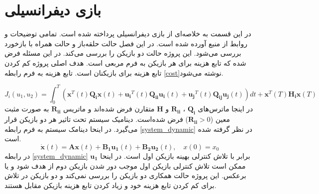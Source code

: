 \chapter{بازی دیفرانسیلی}
در این قسمت به خلاصه‌ای از بازی دیفرانسیلی پرداخته شده است. تمامی توضیحات و روابط  از منبع 
 \cite{article1}
آورده شده است. در این فصل حالت حلقه‌باز
 و حالت همراه با بازخورد بررسی می‌شود.
 این پروژه حالت دو بازیکن را بررسی می‌کند. در این مسئله فرض شده  که تابع هزینه برای هر بازیکن به فرم مربعی است. 	هدف اصلی پروژه کم کردن تابع هزینه برای بازیکنان است. تابع هزینه به فرم رابطه \ref{cost}نوشته می‌شود.

 \begin{equation}\label{cost}
 	J_i(u_1, u_2) = \int_{0}^{T}\left( \boldsymbol{x} ^T(t) \boldsymbol{Q_i} \boldsymbol{x}(t)+
 	 \boldsymbol{u_i} ^T(t) \boldsymbol{Q_{ii}} \boldsymbol{u_i}(t)+
 	 \boldsymbol{u_j} ^T(t)\boldsymbol{ Q_{ij} u_j}(t)
 	\right)dt+
 	\boldsymbol{ x} ^T(T)\boldsymbol{ H_i}\boldsymbol{ x}(T) 
  \end{equation}
در اینجا ماترس‌های 
$\boldsymbol{Q_i}$ ، $\boldsymbol{R_{ii}}$
و
$\boldsymbol{H}$
متقارن فرض شده‌اند و ماتریس 
$\boldsymbol{R_{ii}}$
به صورت مثبت معین ($\boldsymbol{R_{ii}}>0$)
فرض شده‌است.
دینامیک سیستم تحت تاثیر هر دو بازیکن قرار می‌گیرد. در اینحا دینامک سیستم به فرم رابطه \ref{system_dynamic} در نظر گرفته شده ‌است.
\begin{equation}\label{system_dynamic}
	\boldsymbol{\dot x}(t) = \boldsymbol{Ax}(t) + \boldsymbol{B_1u_1}(t) + \boldsymbol{B_2u_2}(t), \quad x(0) = x_0
\end{equation}
در رابطه 
\ref{system_dynamic}
$\boldsymbol{u_1}$
برابر با تلاش کنترلی بهینه بازیکن اول است. در اینحا ممکن است تلاش کنترلی بازیکن اول موجب دور شدن بازیکن دوم از هدف شود و یا برعکس.  این پروژه حالت همکاری دو بازیکن را بررسی نمی‌کند و دو بازیکن در تلاش برای کم کردن تابع هزینه خود و زیاد کردن تابع هزینه بازیکن مقابل هستند.
